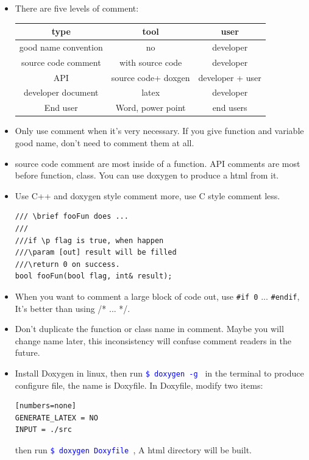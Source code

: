 \documentclass[a4paper,11pt,twoside]{book}
\newcommand{\linuxcommand}[1]{\texttt{\textcolor{blue}{\$ #1 \Pisymbol{psy}{191}}}}
\newcommand{\tophline}{\hline }
\newcommand{\bottomhline}{\\ \hline }
\newcommand{\tophline}{ }
\newcommand{\bottomhline}{ }
\begin{document}
\begin{itemize}
	\item There are five levels of comment: \\
	\begin{tabular}{|c|c|c|}
		\tophline 
		type & tool & user \\ 
		\tophline 
		good name convention & no & developer  \\ 
		\tophline 
		source code comment & with source code &  developer \\ 
		\tophline 
		API & source code+ doxgen  & developer + user  \\ 
		\tophline 
		developer document & latex &  developer \\ 
		\tophline 
		End user & Word, power point & end users 
		\bottomhline 
	\end{tabular} 
	
	\item Only use comment when it's very necessary. If you give function and variable good name, don't need to comment them at all. 
	
	\item source code comment are most inside of a function. API comments are most before function, class. You can use doxygen to produce a html from it. 
	
	\item Use C++ and doxygen style comment more, use C style comment less.
	
\begin{lstlisting}[numbers=none]
/// \brief fooFun does ...
///
///if \p flag is true, when happen
///\param [out] result will be filled
///\return 0 on success.
bool fooFun(bool flag, int& result);
\end{lstlisting}
	
	\item When you want to comment a large block of code out, use \texttt{\#if 0} ...  \texttt{\#endif}, It's better than using /* ... */. 
	
	\item Don't duplicate the function or class name in comment. Maybe you will change name later, this inconsistency will confuse comment readers in the future.
	
	\item Install Doxygen in linux, then run \linuxcommand{doxygen -g} in the terminal to produce configure file, the name is Doxyfile.  In Doxyfile, modify two items:
\begin{verbatim}[numbers=none]
GENERATE_LATEX = NO
INPUT = ./src
\end{verbatim}
	then run \linuxcommand{doxygen Doxyfile}, A html directory will be built.
	

\end{itemize}
\end{document}
